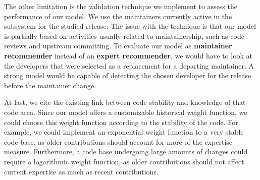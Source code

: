 The other limitation is the validation technique we implement to assess the performance of our model. We use the maintainers currently active in the subsystem for the studied release. The issue with the technique is that our model is partially based on activities usually related to maintainership, such as code reviews and upstream committing. To evaluate our model as \textbf{maintainer recommender} instead of an \textbf{expert recommender}, we would have to look at the developers that were selected as a replacement for a departing maintainer. A strong model would be capable of detecting the chosen developer for the release before the maintainer change.

At last, we cite the existing link between code stability and knowledge of that code area. Since our model offers a customizable historical weight function, we could choose this weight function according to the stability of the code. For example, we could implement an exponential weight function to a very stable code base, as older contributions should account for more of the expertise measure. Furthermore, a code base undergoing large amounts of changes could require a logarithmic weight function, as older contributions should not affect current expertise as much as recent contributions. 



